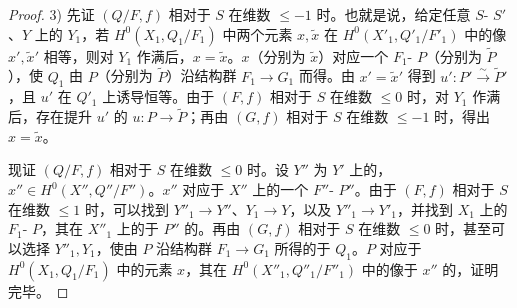\begin{proof}
3) 先证 $(Q/F,f)$ 相对于 $S$ 在维数 $\leqslant-1$ 时。也就是说，给定任意 $S$- $S'$、$Y$ 上的 $Y_1$，若 $H^0(X_1,Q_1/F_1)$ 中两个元素 $x,\widetilde x$ 在 $H^0(X'_1,Q'_1/F'_1)$ 中的像 $x',\widetilde x'$ 相等，则对 $Y_1$ 作满后，$x=\widetilde x$。$x$（分别为 $\widetilde x$）对应一个 $F_1$- $P$（分别为 $\widetilde P$），使 $Q_1$ 由 $P$（分别为 $\widetilde P$）沿结构群 $F_1\to G_1$ 而得。由 $x'=\widetilde x'$ 得到 $u':P'\xrightarrow{\sim}\widetilde P'$，且 $u'$ 在 $Q'_1$ 上诱导恒等。由于 $(F,f)$ 相对于 $S$ 在维数 $\leqslant0$ 时，对 $Y_1$ 作满后，存在提升 $u'$ 的 $u:P\to\widetilde P$；再由 $(G,f)$ 相对于 $S$ 在维数 $\leqslant-1$ 时，得出 $x=\widetilde x$。

现证 $(Q/F,f)$ 相对于 $S$ 在维数 $\leqslant0$ 时。设 $Y''$ 为 $Y'$ 上的，$x''\in H^0(X'',Q''/F'')$。$x''$ 对应于 $X''$ 上的一个 $F''$- $P''$。由于 $(F,f)$ 相对于 $S$ 在维数 $\leqslant1$ 时，可以找到 $Y''_1\to Y''$、$Y_1\to Y$，以及 $Y''_1\to Y'_1$，并找到 $X_1$ 上的 $F_1$- $P$，其在 $X''_1$ 上的于 $P''$ 的。再由 $(G,f)$ 相对于 $S$ 在维数 $\leqslant0$ 时，甚至可以选择 $Y''_1,Y_1$，使由 $P$ 沿结构群 $F_1\to G_1$ 所得的于 $Q_1$。$P$ 对应于 $H^0(X_1,Q_1/F_1)$ 中的元素 $x$，其在 $H^0(X''_1,Q''_1/F''_1)$ 中的像于 $x''$ 的，证明完毕。
\end{proof}

